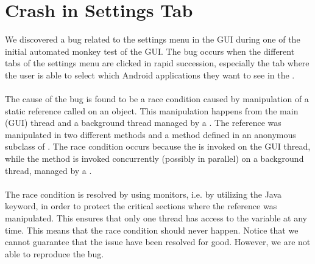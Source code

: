 \section{Crash in Settings Tab}
\label{sec:crash_in_settings_tab}

We discovered a bug related to the settings menu in the \launcher GUI during one of the initial automated monkey test of the GUI. The bug occurs when the different tabs of the settings menu are clicked in rapid succession, especially the tab where the user is able to select which Android applications they want to see in the \giraf \launcher.
\\\\
The cause of the bug is found to be a race condition caused by manipulation of a static reference called  on an  object. This manipulation happens from the main (GUI) thread and a background thread managed by a . The reference was manipulated in two different methods  and a method  defined in an anonymous subclass of . The race condition occurs because the  is invoked on the GUI thread, while the  method is invoked concurrently (possibly in parallel) on a background thread, managed by a .
\\\\
The race condition is resolved by using monitors, i.e. by utilizing the  Java keyword, in order to protect the critical sections where the  reference was manipulated. This ensures that only one thread has access to the variable at any time. This means that the race condition should never happen. Notice that we cannot guarantee that the issue have been resolved for good. However, we are not able to reproduce the bug.